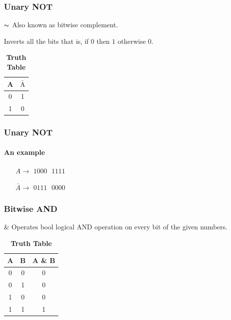 \documentclass[table, compress]{beamer}
\begin{document}
\begin{frame}
    \frametitle{Unary NOT}
    \begin{block}{$\thicksim$}
    	Also known as bitwise complement.
    \end{block}
    Inverts all the bits that is, if $0$ then $1$ otherwise $0$.
    \begin{table}
    \centering
    \begin{tabular}{| c  c |}
    	\hline
    	A & {\footnotesize $\bar{\textrm{A}}$}\\ \hline\hline
    	0 & 1\\ \hline
    	1 & 0\\ \hline
    \end{tabular}
    \caption*{\textbf{Truth Table}}
    \end{table}

\end{frame}


\begin{frame}
    \frametitle{Unary NOT}
    \framesubtitle{An example}
    \begin{example}
   	\begin{itemize}
   		\item[{\footnotesize $A\rightarrow$}] $1000\textrm{ }1111$
   		\item[{\footnotesize $\bar{A}\rightarrow$}] $0111\textrm{ }0000$
 	\end{itemize}
    \end{example}

\end{frame}


\begin{frame}
    \frametitle{Bitwise AND}
    
    \begin{block}{\&}
    	Operates bool logical AND operation on every bit of the given numbers.
    \end{block}
    
    \begin{table}
    \centering
    \begin{tabular}{| c  c c |}
    	\hline
    	A & B & A \& B\\ \hline\hline
    	0 & 0 & 0 \\ \hline
    	0 & 1 & 0 \\ \hline
    	1 & 0 & 0 \\ \hline
    	1 & 1 & 1 \\ \hline
    \end{tabular}
    \caption*{\textbf{Truth Table}}
    \end{table}
\end{frame}
\end{document}
